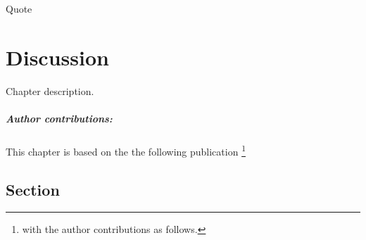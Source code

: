 \begin{savequote}[8cm]
    Quote
\end{savequote}
    
\chapter{\label{discussion}Discussion} 

Chapter description.
\small\paragraph{Author contributions:} This chapter is based on the the following publication \footnote{with the author contributions as follows.} \par\vspace{1em}

\minitoc

\clearpage

\section{Section}

    \blindtext